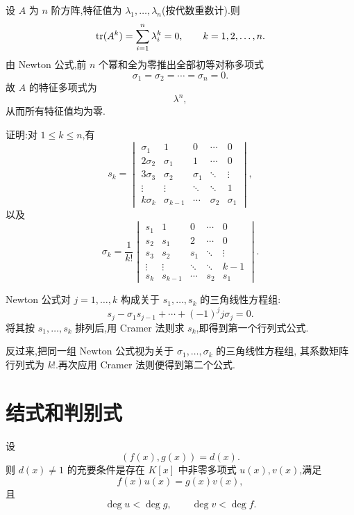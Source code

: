\begin{solution}
设 $A$ 为 $n$ 阶方阵,特征值为 $\lambda_1,\ldots,\lambda_n$(按代数重数计).则
\[
  \operatorname{tr}(A^k)=\sum\limits_{i=1}^{n}\lambda_i^k=0,
  \qquad k=1,2,\ldots,n.
\]
由 Newton 公式,前 $n$ 个幂和全为零推出全部初等对称多项式
\[
  \sigma_1=\sigma_2=\cdots=\sigma_n=0.
\]
故 $A$ 的特征多项式为
\[
  \lambda^n,
\]
从而所有特征值均为零.
\end{solution}

\begin{example}[\markstar]
证明:对 $1\le k\le n$,有
\[
  s_k=
  \begin{vmatrix}
    \sigma_1&1&0&\cdots&0\\
    2\sigma_2&\sigma_1&1&\cdots&0\\
    3\sigma_3&\sigma_2&\sigma_1&\ddots&\vdots\\
    \vdots&\vdots&\ddots&\ddots&1\\
    k\sigma_k&\sigma_{k-1}&\cdots&\sigma_2&\sigma_1
  \end{vmatrix},
\]
以及
\[
  \sigma_k=\dfrac1{k!}
  \begin{vmatrix}
    s_1&1&0&\cdots&0\\
    s_2&s_1&2&\cdots&0\\
    s_3&s_2&s_1&\ddots&\vdots\\
    \vdots&\vdots&\ddots&\ddots&k-1\\
    s_k&s_{k-1}&\cdots&s_2&s_1
  \end{vmatrix}.
\]
\end{example}
\exampleblank

\begin{solution}
Newton 公式对 $j=1,\ldots,k$ 构成关于 $s_1,\ldots,s_k$ 的三角线性方程组:
\[
  s_j-\sigma_1s_{j-1}+\cdots+(-1)^j j\sigma_j=0.
\]
将其按 $s_1,\ldots,s_k$ 排列后,用 Cramer 法则求 $s_k$,即得到第一个行列式公式.

反过来,把同一组 Newton 公式视为关于 $\sigma_1,\ldots,\sigma_k$ 的三角线性方程组,
其系数矩阵行列式为 $k!$.再次应用 Cramer 法则便得到第二个公式.
\end{solution}


\newpage

\section{结式和判别式}

\begin{lemma}
设
\[
  (f(x),g(x))=d(x).
\]
则 $d(x)\ne1$ 的充要条件是存在 $K[x]$ 中非零多项式 $u(x),v(x)$,满足
\[
  f(x)u(x)=g(x)v(x),
\]
且
\[
  \deg u<\deg g,
  \qquad
  \deg v<\deg f.
\]
\end{lemma}


